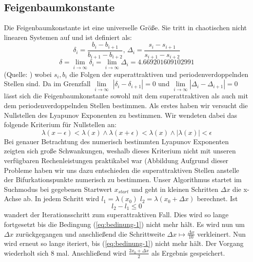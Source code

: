 \documentclass[12pt,a4paper]{article}
\begin{document}
\subsection{Feigenbaumkonstante}
Die Feigenbaumkonstante ist eine universelle Größe. Sie tritt in chaotischen nicht linearen Systemen auf und ist definiert als:
\begin{equation}\delta_i = \frac{b_i-b_{i+1}}{b_{i+1}-b_{i+2}}\text{, }\Delta_i=\frac{s_i-s_{i+1}}{s_{i+1}-s_{i+2}}\end{equation}
\begin{equation}\delta = \lim\limits_{i \rightarrow \infty}{\delta_i}= \lim\limits_{i \rightarrow \infty}{\Delta_i} = 4.669201609102991\end{equation} 
(Quelle: \parencite{feigenbaum})
wobei $s_i, b_i$ die Folgen der superattraktiven und periodenverdoppelnden Stellen sind.
Da im Grenzfall $\lim\limits_{i \rightarrow \infty}$ $|\delta_i - \delta_{i+1}|=0$ und $\lim\limits_{i \rightarrow \infty} |\Delta_i - \Delta_{i+1}|=0$  lässt sich die Feigenbaumkonstante sowohl mit dem superattraktiven als auch mit dem periodenverdoppelnden Stellen bestimmen. 
Als erstes haben wir versucht die Nullstellen des Lyapunov Exponenten zu bestimmen. Wir wendeten dabei das folgende Kriterium für Nullstellen an:
\begin{equation}
\lambda(x-\epsilon) < \lambda(x) \wedge \lambda(x+\epsilon) < \lambda(x) \wedge |\lambda(x)|<\epsilon
\end{equation}
Bei genauer Betrachtung des numerisch bestimmten Lyapunov Exponenten zeigten sich große Schwankungen, weshalb dieses Kriterium nicht mit unseren verfügbaren Rechenleistungen praktikabel war (Abbildung 
Aufgrund dieser Probleme
haben wir uns dazu entschieden die superattraktiven Stellen anstelle der Bifurkationspunkte numerisch zu bestimmen. Unser Algorithmus startet im Suchmodus bei gegebenen Startwert $x_{start}$ und geht in kleinen Schritten $\Delta x$ die x-Achse ab. In jedem Schritt wird $l_1=\lambda(x_0)$ $l_2=\lambda(x_0 + \Delta x)$ berechnet. 
Ist
\begin{equation}
l_2-l_1 \leq 0 
\label{eq:bedinung-1}
\end{equation}
wandert der Iterationsschritt zum superattraktiven Fall. 
Dies wird so lange fortgesetzt bis die Bedingung (\ref{eq:bedinung-1}) nicht mehr hält. 
Es wird nun um $\Delta x$ zurückgegangen und anschließend die Schrittweite $\Delta x \mapsto \frac{\Delta x}{10} $ verkleinert. Nun wird erneut so lange iteriert, bis (\ref{eq:bedinung-1}) nicht mehr hält. 
Der Vorgang wiederholt sich 8 mal. Anschließend wird $\frac{2x_0 + \Delta x}{2}$ als Ergebnis gespeichert. 
\end{document}
